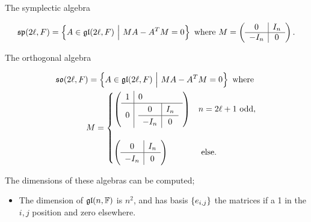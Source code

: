 
The symplectic algebra

\begin{align*}
{\mathfrak{sp}}(2\ell, F) = \left\{{A \in {\mathfrak{gl}}(2\ell, F){~\mathrel{\Big|}~} MA-A^{T}M = 0}\right\} \text{ where }
M = \left(\begin{array}{c|c}{0} & {I_{n}} \\ \hline {-I_{n}} & {0}\end{array}\right)
.\end{align*}



The orthogonal algebra

\begin{align*}
{\mathfrak{so}}(2\ell, F) = \left\{{A \in {\mathfrak{gl}}(2\ell, F){~\mathrel{\Big|}~} MA-A^{T}M = 0}\right\} \text{ where } \\
M = \begin{cases}
\left(\begin{array}{l|l}
{1} & {0} \\ \hline
{0} & {\begin{array}{c|c}{0} & {I_{n}} \\\hline {-I_{n}} & {0}\end{array}}
\end{array}\right) & n=2\ell + 1 \text{ odd},\\ \\
\left(\begin{array}{c|c}{0} & {I_{n}} \\ \hline {-I_{n}} & {0}\end{array}\right) & \text{ else}.
\end{cases}
\end{align*}


 The dimensions of these algebras can be
computed;

\begin{itemize}
\tightlist
\item
  The dimension of \({\mathfrak{gl}}(n, {\mathbb{F}})\) is \(n^{2}\), and has basis
  \({\left\{{e_{{i,j}}}\right\}}\) the matrices if a 1 in the \(i,j\) position
  and zero elsewhere.
\end{itemize}

